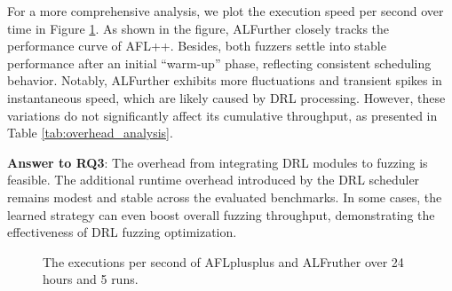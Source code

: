 \documentclass[lettersize,journal]{IEEEtran}
\begin{document}
For a more comprehensive analysis, we plot the execution speed per second  over time in Figure \ref{fig:overhead_plot}. As shown in the figure, ALFurther closely tracks the performance curve of AFL++. Besides, both fuzzers settle into stable performance after an initial “warm-up” phase, reflecting consistent scheduling behavior. Notably, ALFurther exhibits more fluctuations and transient spikes in instantaneous speed, which are likely caused by DRL processing. However, these variations do not significantly affect its cumulative throughput, as presented in Table \ref{tab:overhead_analysis}.

\textbf{Answer to RQ3}: The overhead from integrating DRL modules to fuzzing is feasible. The additional runtime overhead introduced by the DRL scheduler remains modest and stable across the evaluated benchmarks. In some cases, the learned strategy can even boost overall fuzzing throughput, demonstrating the effectiveness of DRL fuzzing optimization.
\begin{figure}[t!]
	\caption{The executions per second of AFLplusplus and ALFruther over 24 hours and 5 runs.}
	\label{fig:overhead_plot}
\end{figure}
\end{document}

